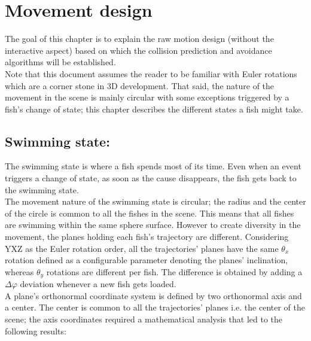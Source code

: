 \chapter{Movement design}
The goal of this chapter is to explain the raw motion design (without the interactive aspect) based on which the collision prediction and avoidance algorithms will be established.\\

Note that this document assumes the reader to be familiar with Euler rotations which are a corner stone in 3D development. That said, the nature of the movement in the scene is mainly circular with some exceptions triggered by a fish's change of state; this chapter describes the different states a fish might take.

\section{Swimming state:}
\label{subsec:swimmingstate}

The swimming state is where a fish spends most of its time. Even when an event triggers a change of state, as soon as the cause disappears, the fish gets back to the swimming state.\\

The movement nature of the swimming state is circular; the radius and the center of the circle is common to all the fishes in the scene. This means that all fishes are swimming within the same sphere surface. However to create diversity in the movement, the planes holding each fish's trajectory are different. Considering YXZ as the Euler rotation order, all the trajectories' planes have the same $\theta _{x}$ rotation defined as a configurable parameter denoting the planes' inclination, whereas $\theta _{y}$ rotations are different per fish. The difference is obtained by adding a $\Delta \varphi$ deviation whenever a new fish gets loaded.\\

A plane's orthonormal coordinate system is defined by two orthonormal axis and a center. The center is common to all the trajectories' planes i.e. the center of the scene; the axis coordinates required a mathematical analysis that led to the following results:\\

